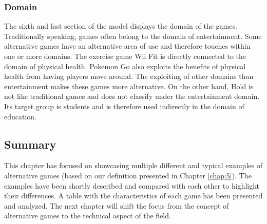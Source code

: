 \documentclass[../Main.tex]{subfiles}
\begin{document}
\subsubsection{Domain}
The sixth and last section of the model displays the domain of the games. Traditionally speaking, games often belong to the domain of entertainment. Some alternative games have an alternative area of use and therefore touches within one or more domains. The exercise game Wii Fit is directly connected to the domain of physical health. Pokemon Go also exploits the benefits of physical health from having players move around. The exploiting of other domains than entertainment makes these games more alternative. On the other hand, Hold is not like traditional games and does not classify under the entertainment domain. Its target group is students and is therefore used indirectly in the domain of education.

\subsection{Summary}
This chapter has focused on showcasing multiple different and typical examples of alternative games (based on our definition presented in Chapter \ref{chap:5}). The examples have been shortly described and compared with each other to highlight their differences. A table with the characteristics of each game has been presented and analyzed. The next chapter will shift the focus from the concept of alternative games to the technical aspect of the field.

\biblio %
\end{document}

